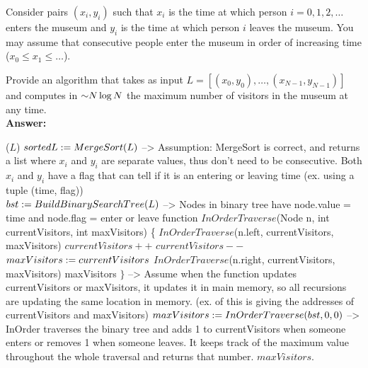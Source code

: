 \begin{problem}
Consider pairs $(x_i, y_i)$ such that $x_i$ is the time at which person $i = 0, 1, 2 , \dots$ enters the museum and $y_i$ is the time at which person $i$ leaves the museum.  You may assume that consecutive people enter the museum in order of increasing time ($x_0 \leq x_1 \leq \dots$).
\begin{questions}
\item Provide an algorithm  that takes as input $L = [(x_0, y_0), \dots, (x_{N-1}, y_{N-1})]$ and computes in $\mathord{\sim}N \log N$ the maximum number of visitors in the museum at any time.\\
\textbf{Answer:}\\

\begin{myalgo}{($L$)}
    \STATE $sortedL := MergeSort(L)$ --> Assumption: MergeSort is correct, and returns a list where $x_i$ and $y_i$ are separate values, thus don't need to be consecutive. Both $x_i$ and $y_i$ have a flag that can tell if it is an entering or leaving time (ex. using a tuple (time, flag))\\
    \STATE $bst := BuildBinarySearchTree(L)$ --> Nodes in binary tree have node.value = time and node.flag = enter or leave
    \STATE function $InOrderTraverse$(Node n, int currentVisitors, int maxVisitors) \{
            \STATE $InOrderTraverse$(n.left, currentVisitors, maxVisitors)
        \ENDIF
            \STATE $currentVisitors++$
            \STATE $currentVisitors--$
        \ENDIF
            \STATE $maxVisitors := currentVisitors$
        \ENDIF
            \STATE $InOrderTraverse$(n.right, currentVisitors, maxVisitors)
        \ENDIF
        \RETURN maxVisitors
    \STATE $\}$ --> Assume when the function updates currentVisitors or maxVisitors, it updates it in main memory, so all recursions are updating the same location in memory. (ex. of this is giving the addresses of currentVisitors and maxVisitors) 
    \STATE $maxVisitors := InOrderTraverse(bst, 0, 0)$ --> InOrder traverses the binary tree and adds 1 to currentVisitors when someone enters or removes 1 when someone leaves. It keeps track of the maximum value throughout the whole traversal and returns that number. 
    \RETURN $maxVisitors$.
\end{myalgo}


\end{questions}
\end{problem}
